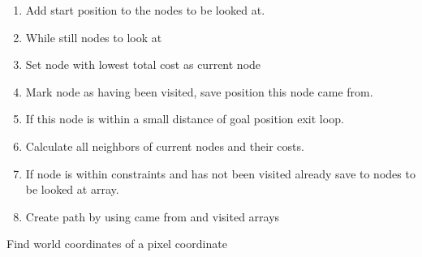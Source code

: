 \begin{algorithm}
	\begin{enumerate}
		\item Add start position to the nodes to be looked at.
		\item While still nodes to look at
		\item Set node with lowest total cost as current node
		\item Mark node as having been visited, save position this node came from.
		\item If this node is within a small distance of goal position exit loop.
		\item Calculate all neighbors of current nodes and their costs.
		\item If node is within constraints and has not been visited already save to nodes to be looked at array.
		\item Create path by using came from and visited arrays
	\end{enumerate}
\caption{Find world coordinates of a pixel coordinate}
\label{alg:cam}
\end{algorithm}